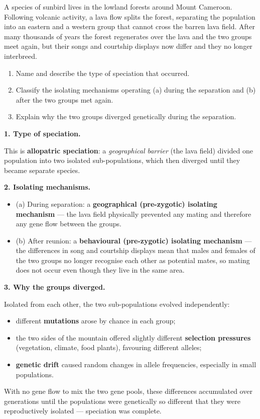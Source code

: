 \documentclass[11pt]{article}
\begin{document}
\begin{exoresolu}
A species of sunbird lives in the lowland forests around Mount Cameroon. Following volcanic activity, a lava flow splits the forest, separating the population into an eastern and a western group that cannot cross the barren lava field. After many thousands of years the forest regenerates over the lava and the two groups meet again, but their songs and courtship displays now differ and they no longer interbreed.
\begin{enumerate}
\item Name and describe the type of speciation that occurred.
\item Classify the isolating mechanisms operating (a) during the separation and (b) after the two groups met again.
\item Explain why the two groups diverged genetically during the separation.
\end{enumerate}
\tcblower
\textbf{1. Type of speciation.}

This is \textbf{allopatric speciation}: a \emph{geographical barrier} (the lava field) divided one population into two isolated sub-populations, which then diverged until they became separate species.

\textbf{2. Isolating mechanisms.}
\begin{itemize}
\item (a) During separation: a \textbf{geographical (pre-zygotic) isolating mechanism} — the lava field physically prevented any mating and therefore any gene flow between the groups.
\item (b) After reunion: a \textbf{behavioural (pre-zygotic) isolating mechanism} — the differences in song and courtship displays mean that males and females of the two groups no longer recognise each other as potential mates, so mating does not occur even though they live in the same area.
\end{itemize}

\textbf{3. Why the groups diverged.}

Isolated from each other, the two sub-populations evolved independently:
\begin{itemize}
\item different \textbf{mutations} arose by chance in each group;
\item the two sides of the mountain offered slightly different \textbf{selection pressures} (vegetation, climate, food plants), favouring different alleles;
\item \textbf{genetic drift} caused random changes in allele frequencies, especially in small populations.
\end{itemize}
With no gene flow to mix the two gene pools, these differences accumulated over generations until the populations were genetically so different that they were reproductively isolated — speciation was complete.
\end{exoresolu}
\end{document}
